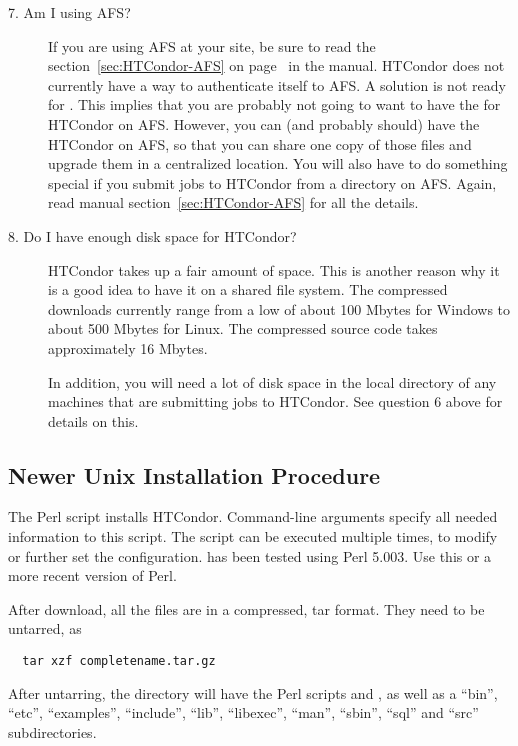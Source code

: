\begin{description}
\item[7. Am I using AFS?]

If you are using AFS at your site, be sure to read the
section~\ref{sec:HTCondor-AFS} on page~\pageref{sec:HTCondor-AFS} in the
manual.
HTCondor does not currently have a way to authenticate itself to AFS.
A solution is not ready for
\VersionNotice.
This implies that you are probably not going to want
to have the  for HTCondor on AFS.
However, you can
(and probably should) have the HTCondor  on AFS, so
that you can share one copy of those files and upgrade them in a
centralized location.  You will also have to do something special if
you submit jobs to HTCondor from a directory on AFS.  Again, read manual
section~\ref{sec:HTCondor-AFS} for all the details.

\item[8. Do I have enough disk space for HTCondor?]

HTCondor takes up a fair amount of space.
This is another reason why it is a good idea to have it on a shared
file system.
The compressed downloads currently range from a low of about 100 Mbytes
for Windows to about 500 Mbytes for Linux.
The compressed source code takes approximately 16 Mbytes.

In addition, you will need a lot of disk space in the local directory
of any machines that are submitting jobs to HTCondor.  See question 6
above for details on this.

\end{description}

\subsection{\label{sec:new-install-procedure}
Newer Unix Installation Procedure}

The Perl script  installs HTCondor.
Command-line arguments specify all needed information to this
script.  The script can be executed multiple times, to modify or further
set the configuration.   has been tested using Perl 5.003.
Use this or a more recent version of Perl.

After download, all the files are in a compressed, tar format.
They need to be untarred, as
\begin{verbatim}
  tar xzf completename.tar.gz
\end{verbatim}
After untarring, the directory will have the Perl scripts
 and , as well as a ``bin'', ``etc'',
``examples'', ``include'', ``lib'', ``libexec'', ``man'', ``sbin'',
``sql'' and ``src'' subdirectories.

